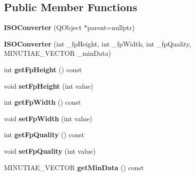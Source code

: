 \subsection*{Public Member Functions}
\begin{DoxyCompactItemize}
\item 
\mbox{\label{class_i_s_o_converter_afb05fb9d72c9bfe54ba3c9471f3f389b}} 
{\bfseries I\+S\+O\+Converter} (Q\+Object $\ast$parent=nullptr)
\item 
\mbox{\label{class_i_s_o_converter_a2c1721668b1aa67a315c8b3009e4a324}} 
{\bfseries I\+S\+O\+Converter} (int \+\_\+fp\+Height, int \+\_\+fp\+Width, int \+\_\+fp\+Quality, M\+I\+N\+U\+T\+I\+A\+E\+\_\+\+V\+E\+C\+T\+OR \+\_\+min\+Data)
\item 
\mbox{\label{class_i_s_o_converter_a4d93421c8abe011698a4fc74f1f0b293}} 
int {\bfseries get\+Fp\+Height} () const
\item 
\mbox{\label{class_i_s_o_converter_ad0f6048bbbac9a08eeff68aff9886cae}} 
void {\bfseries set\+Fp\+Height} (int value)
\item 
\mbox{\label{class_i_s_o_converter_acdf9f66ad3d6c60f15a9484354271457}} 
int {\bfseries get\+Fp\+Width} () const
\item 
\mbox{\label{class_i_s_o_converter_adf4213214d12b18d42404fd1090f8560}} 
void {\bfseries set\+Fp\+Width} (int value)
\item 
\mbox{\label{class_i_s_o_converter_a133aa8a11824df3d3857f16f7dab4172}} 
int {\bfseries get\+Fp\+Quality} () const
\item 
\mbox{\label{class_i_s_o_converter_ae9e8206e3ee6244d3479d64ca6888119}} 
void {\bfseries set\+Fp\+Quality} (int value)
\item 
\mbox{\label{class_i_s_o_converter_a1aa4b52be3a56c0e5de63b8e0d24697c}} 
M\+I\+N\+U\+T\+I\+A\+E\+\_\+\+V\+E\+C\+T\+OR {\bfseries get\+Min\+Data} () const
\item 
\mbox{\label{class_i_s_o_converter_adc02bedbeb249d5803dfa2065799a684}} 

\end{DoxyCompactItemize}
